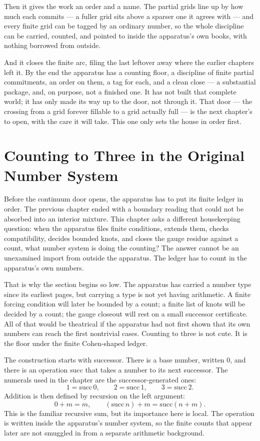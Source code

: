 Then it gives the work an order and a name. The partial grids line up by how much each commits --- a fuller grid sits above a sparser one it agrees with --- and every finite grid can be tagged by an ordinary number, so the whole discipline can be carried, counted, and pointed to inside the apparatus's own books, with nothing borrowed from outside.

And it closes the finite arc, filing the last leftover away where the earlier chapters left it. By the end the apparatus has a counting floor, a discipline of finite partial commitments, an order on them, a tag for each, and a clean close --- a substantial package, and, on purpose, not a finished one. It has not built that complete world; it has only made its way up to the door, not through it. That door --- the crossing from a grid forever fillable to a grid actually full --- is the next chapter's to open, with the care it will take. This one only sets the house in order first.

\section{Counting to Three in the Original Number System}

Before the continuum door opens, the apparatus has to put its finite ledger in
order. The previous chapter ended with a boundary reading that could not be
absorbed into an interior mixture. This chapter asks a different housekeeping
question: when the apparatus files finite conditions, extends them, checks
compatibility, decides bounded knots, and closes the gauge residue against a
count, what number system is doing the counting? The answer cannot be an
unexamined import from outside the apparatus. The ledger has to count in the
apparatus's own numbers.

That is why the section begins so low. The apparatus has carried a number type
since its earliest pages, but carrying a type is not yet having arithmetic. A
finite forcing condition will later be bounded by a count; a finite list of
knots will be decided by a count; the gauge closeout will rest on a small
successor certificate. All of that would be theatrical if the apparatus had not
first shown that its own numbers can reach the first nontrivial cases. Counting
to three is not cute. It is the floor under the finite Cohen-shaped ledger.

The construction starts with successor. There is a base number, written \(0\),
and there is an operation \(\mathrm{succ}\) that takes a number to its next
successor. The numerals used in the chapter are the successor-generated ones:
\[
  1=\mathrm{succ}\,0,
  \qquad
  2=\mathrm{succ}\,1,
  \qquad
  3=\mathrm{succ}\,2.
\]
Addition is then defined by recursion on the left argument:
\[
  0 + m = m,
  \qquad
  (\mathrm{succ}\,n) + m = \mathrm{succ}(n + m).
\]
This is the familiar recursive sum, but its importance here is local. The
operation is written inside the apparatus's number system, so the finite counts
that appear later are not smuggled in from a separate arithmetic background.

